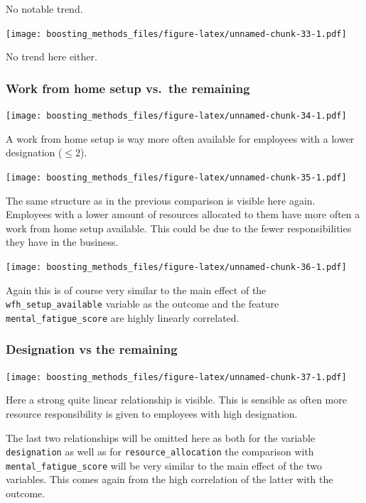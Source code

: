 \documentclass[
]{book}
\begin{document}
No notable trend.

\texttt{[image: boosting\_methods\_files/figure-latex/unnamed-chunk-33-1.pdf]}

No trend here either.

\hypertarget{work-from-home-setup-vs.-the-remaining}{%
\subsubsection{Work from home setup vs.~the remaining}\label{work-from-home-setup-vs.-the-remaining}}

\texttt{[image: boosting\_methods\_files/figure-latex/unnamed-chunk-34-1.pdf]}

A work from home setup is way more often available for employees with a lower designation (\(\leq 2\)).

\texttt{[image: boosting\_methods\_files/figure-latex/unnamed-chunk-35-1.pdf]}

The same structure as in the previous comparison is visible here again. Employees with a lower amount of resources allocated to them have more often a work from home setup available. This could be due to the fewer responsibilities they have in the business.

\texttt{[image: boosting\_methods\_files/figure-latex/unnamed-chunk-36-1.pdf]}

Again this is of course very similar to the main effect of the \texttt{wfh\_setup\_available} variable as the outcome and the feature \texttt{mental\_fatigue\_score} are highly linearly correlated.

\hypertarget{designation-vs-the-remaining}{%
\subsubsection{Designation vs the remaining}\label{designation-vs-the-remaining}}

\texttt{[image: boosting\_methods\_files/figure-latex/unnamed-chunk-37-1.pdf]}

Here a strong quite linear relationship is visible. This is sensible as often more resource responsibility is given to employees with high designation.

The last two relationships will be omitted here as both for the variable \texttt{designation} as well as for \texttt{resource\_allocation} the comparison with \texttt{mental\_fatigue\_score} will be very similar to the main effect of the two variables. This comes again from the high correlation of the latter with the outcome.
\end{document}
